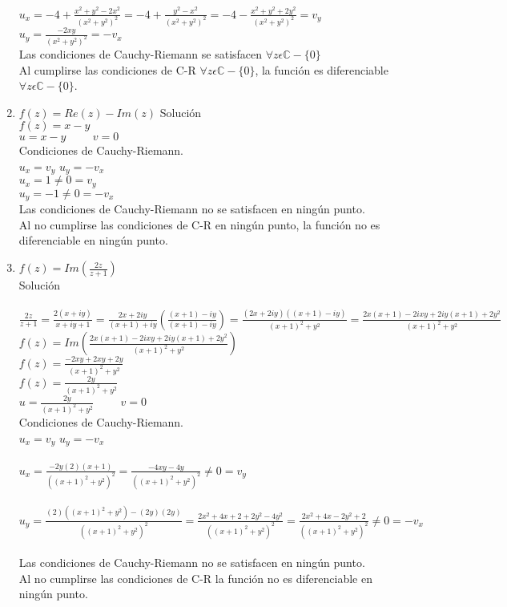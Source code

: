 \begin{enumerate}
$u_x =-4+\frac{x^2+y^2-2x^2}{(x^2+y^2)^2}= -4+\frac{y^2-x^2}{(x^2+y^2)^2}= -4-\frac{x^2+y^2+2y^2}{(x^2+y^2)^2} = v_y$\\
$u_y = \frac{-2xy}{(x^2+y^2)^2}=-v_x$\\
Las condiciones de Cauchy-Riemann se satisfacen $\forall z \epsilon \mathbb{C}-\{0\}$\\
Al cumplirse las condiciones de C-R $\forall z \epsilon \mathbb{C}-\{0\}$, la funci\'on es diferenciable $\forall z \epsilon \mathbb{C}-\{0\}$.
\item $f(z)= Re(z)-Im(z)$
Soluci\'on\\
$f(z)= x-y$\\
$u=x-y \hspace{1cm} v=0$\\
Condiciones de Cauchy-Riemann.\\
$u_x=v_y$ \hspace{1cm} $u_y=-v_x$\\
$u_x = 1 \neq 0 = v_y$\\
$u_y = -1\neq 0 =-v_x$\\
Las condiciones de Cauchy-Riemann no se satisfacen en ning\'un punto.\\
Al no cumplirse las condiciones de C-R en ning\'un punto, la funci\'on no es diferenciable en ning\'un punto.
\item $f(z)= Im(\frac{2z}{z+1})$ \\
Soluci\'on\\ \\
$\frac{2z}{z+1} = \frac{2(x+iy)}{x+iy+1} = \frac{2x+2iy}{(x+1)+iy} (\frac{(x+1)-iy}{(x+1)-iy})= \frac{(2x+2iy)((x+1)-iy)}{(x+1)^2+y^2} = \frac{2x(x+1)-2ixy+2iy(x+1)+2y^2}{(x+1)^2+y^2}$\\
$f(z)= Im(\frac{2x(x+1)-2ixy+2iy(x+1)+2y^2}{(x+1)^2+y^2})$\\
$f(z)= \frac{-2xy+2xy+2y}{(x+1)^2+y^2}$\\
$f(z)= \frac{2y}{(x+1)^2+y^2}$\\
$u=\frac{2y}{(x+1)^2+y^2} \hspace{1cm} v=0$\\
Condiciones de Cauchy-Riemann.\\
$u_x=v_y$ \hspace{1cm} $u_y=-v_x$\\ \\
$u_x=\frac{-2y(2)(x+1)}{((x+1)^2+y^2)^2} = \frac{-4xy-4y}{((x+1)^2+y^2)^2} \neq 0 = v_y$\\ \\
$u_y = \frac{(2)((x+1)^2+y^2)-(2y)(2y)}{((x+1)^2+y^2)^2} = \frac{2x^2+4x+2+2y^2-4y^2}{((x+1)^2+y^2)^2} = \frac{2x^2+4x-2y^2+2}{((x+1)^2+y^2)^2} \neq 0 =-v_x$\\ \\
Las condiciones de Cauchy-Riemann no se satisfacen en ning\'un punto.\\
Al no cumplirse las condiciones de C-R la funci\'on no es diferenciable en ning\'un punto.
\end{enumerate}
